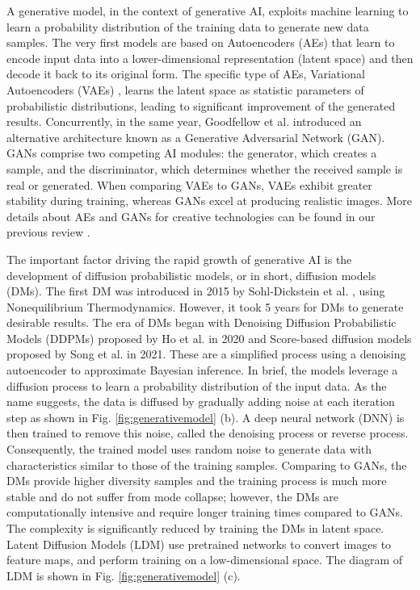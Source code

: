 \documentclass[11pt,a4paper]{article}
\begin{document}
A generative model, in the context of generative AI, exploits machine learning to learn a probability distribution of the training data to generate new data samples. The very first models are based on Autoencoders (AEs) that learn to encode input data into a lower-dimensional representation (latent space) and then decode it back to its original form. The specific type of AEs, Variational Autoencoders (VAEs) \cite{Kingma:auto:2014}, learns the latent space as statistic parameters of probabilistic distributions, leading to significant improvement of the generated results. Concurrently, in the same year, Goodfellow et al. \cite{Goodfellow:GAN:2014} introduced an alternative architecture known as a Generative Adversarial Network (GAN). GANs comprise two competing AI modules: the generator, which creates a sample, and the discriminator, which determines whether the received sample is real or generated. When comparing VAEs to GANs, VAEs exhibit greater stability during training, whereas GANs excel at producing realistic images. More details about AEs and GANs for creative technologies can be found in our previous review \cite{Anantrasirichai:AI:2022}.

The important factor driving the rapid growth of generative AI is the development of diffusion probabilistic models, or in short, diffusion models (DMs). The first DM was introduced in 2015 by Sohl-Dickstein et al. \cite{Dickstein:Deep:2015}, using Nonequilibrium Thermodynamics. However, it took 5 years for DMs to generate desirable results. The era of DMs began with Denoising Diffusion Probabilistic Models (DDPMs) proposed by Ho et al. \cite{Ho:DDPM:2020} in 2020 and Score-based diffusion models proposed by Song et al. \cite{Song:Score:2021} in 2021. These are a simplified process using a denoising autoencoder to approximate Bayesian inference. In brief, the models leverage a diffusion process to learn a probability distribution of the input data. As the name suggests, the data is diffused by gradually adding noise at each iteration step as shown in Fig. \ref{fig:generativemodel} (b). A deep neural network (DNN) is then trained to remove this noise, called the denoising process or reverse process. Consequently, the trained model uses random noise to generate data with characteristics similar to those of the training samples. Comparing to GANs, the DMs provide higher diversity samples \cite{Dhariwal:Diffusion:2021} and the training process is much more stable and do not suffer from mode collapse; however, the DMs are computationally intensive and require longer training times compared to GANs. The complexity is significantly reduced by training the DMs in latent space. Latent Diffusion Models (LDM) \cite{Rombach:LDM:2022} use pretrained networks to convert images to feature maps, and perform training on a low-dimensional space. The diagram of LDM is shown in Fig. \ref{fig:generativemodel} (c). 
\end{document}
